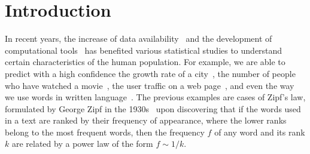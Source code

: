 \documentclass[10pt,letterpaper]{article} %
\begin{document}
\section*{Introduction} %



	
In recent years, the increase of data availability~\cite{Hilbert60} and the development of computational tools~\cite{doi:10.1098/rsta.2019.0061} has
benefited various statistical studies to understand certain characteristics of
the human population. For example, we are able to predict with a high confidence the growth rate of a
city~\cite{Batty:2012Cities,Murcio2015}, the number of people who have watched a movie~\cite{sinha2005blockbusters}, the user traffic on a web
page~\cite{BARABASI200069}, and even the way we use words in written language~\cite{Montemurro2001567,ZipfRnd2002}. The previous examples
are cases of  Zipf's law, formulated by George Zipf in the 1930s~\cite{Zipf,Petruszewycz1973Lhistoire-de-la,newman2005power,1367-2630-13-4-043004,Perc07122012,1367-2630-15-9-093033} upon
discovering that if  the words used in a text are ranked by their frequency of
appearance, where the lower ranks belong to the most frequent words,  then the
frequency  $f$  of any word and its rank  $k$ are related by a power law of the
form $f\sim1/k$.




\end{document}

